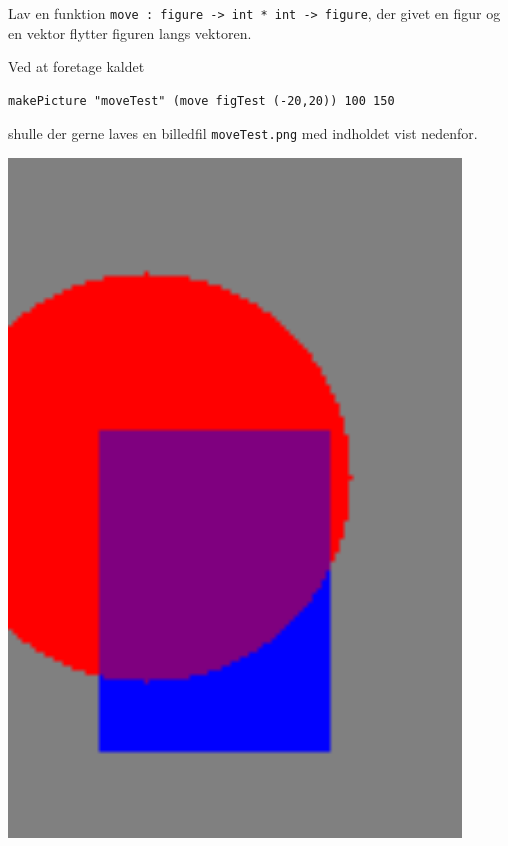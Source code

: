 Lav en funktion \texttt{move : figure -> int * int ->
    figure}, der givet en figur og en vektor flytter figuren langs
  vektoren.
  
  Ved at foretage kaldet
\begin{verbatim}
makePicture "moveTest" (move figTest (-20,20)) 100 150
\end{verbatim}
  shulle der gerne laves en billedfil \texttt{moveTest.png}
  med indholdet vist nedenfor.
  \begin{center}
    \begin{minipage}{.2\textwidth}
      \includegraphics[width=0.9\textwidth]{moveTest.png}
    \end{minipage}
  \end{center}